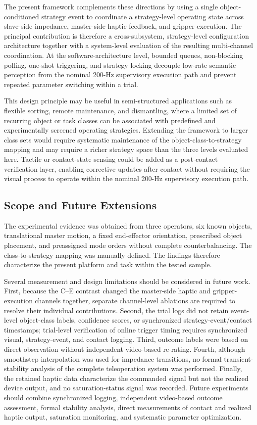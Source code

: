 The present framework complements these directions by using a single object-conditioned strategy event to coordinate a strategy-level operating state across slave-side impedance, master-side haptic feedback, and gripper execution. The principal contribution is therefore a cross-subsystem, strategy-level configuration architecture together with a system-level evaluation of the resulting multi-channel coordination. At the software-architecture level, bounded queues, non-blocking polling, one-shot triggering, and strategy locking decouple low-rate semantic perception from the nominal 200-Hz supervisory execution path and prevent repeated parameter switching within a trial.

This design principle may be useful in semi-structured applications such as flexible sorting, remote maintenance, and dismantling, where a limited set of recurring object or task classes can be associated with predefined and experimentally screened operating strategies. Extending the framework to larger class sets would require systematic maintenance of the object-class-to-strategy mapping and may require a richer strategy space than the three levels evaluated here. Tactile or contact-state sensing could be added as a post-contact verification layer, enabling corrective updates after contact without requiring the visual process to operate within the nominal 200-Hz supervisory execution path.
\subsection{Scope and Future Extensions}
The experimental evidence was obtained from three operators, six known objects, translational master motion, a fixed end-effector orientation, prescribed object placement, and preassigned mode orders without complete counterbalancing. The class-to-strategy mapping was manually defined. The findings therefore characterize the present platform and task within the tested sample.

Several measurement and design limitations should be considered in future work. First, because the C--E contrast changed the master-side haptic and gripper-execution channels together, separate channel-level ablations are required to resolve their individual contributions. Second, the trial logs did not retain event-level object-class labels, confidence scores, or synchronized strategy-event/contact timestamps; trial-level verification of online trigger timing requires synchronized visual, strategy-event, and contact logging. Third, outcome labels were based on direct observation without independent video-based re-rating. Fourth, although smoothstep interpolation was used for impedance transitions, no formal transient-stability analysis of the complete teleoperation system was performed. Finally, the retained haptic data characterize the commanded signal but not the realized device output, and no saturation-status signal was recorded. Future experiments should combine synchronized logging, independent video-based outcome assessment, formal stability analysis, direct measurements of contact and realized haptic output, saturation monitoring, and systematic parameter optimization.
